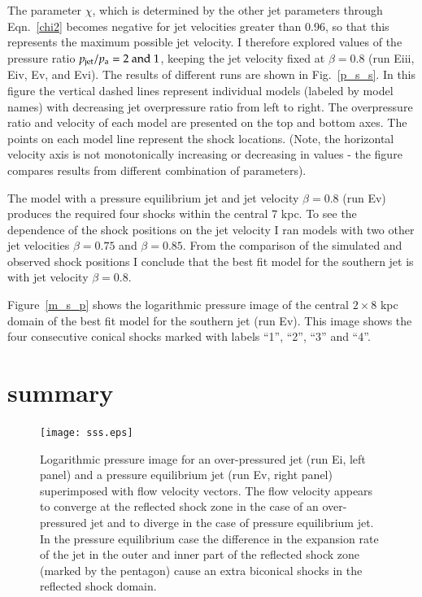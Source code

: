 The parameter $\chi$, which is determined by the other jet parameters through Eqn.~\ref{chi2} becomes negative for jet velocities greater than 0.96, so that this represents the maximum possible jet velocity. I therefore explored values of the pressure ratio $p_\mathrm{jet}/p_\mathrm{a} = 2 \rm  \ and \ 1$, keeping the jet velocity fixed at $\beta = 0.8$ (run Eiii, Eiv, Ev, and Evi). The results of different runs are shown in Fig.~\ref{p_s_s}. In this figure the vertical dashed lines represent individual models (labeled by model names) with decreasing jet overpressure ratio from left to right. The overpressure ratio and velocity of each model are presented on the top and bottom axes. The points on each model line represent the shock locations. (Note, the horizontal velocity axis is not monotonically increasing or decreasing in values - the figure compares results from different combination of parameters).

The model with a pressure equilibrium jet and jet velocity $\beta=0.8$ (run Ev) produces the required four shocks within the central 7 kpc. To see the dependence of the shock positions on the jet velocity I  ran models with two other jet velocities $\beta=0.75$ and $\beta=0.85$. From the comparison of the simulated and observed shock positions I conclude that the best fit model for the southern jet is with jet velocity $\beta = 0.8$. 

Figure~\ref{m_s_p} shows the logarithmic pressure image of the central $2\times8$ kpc domain of the best fit model for the southern jet (run Ev). This image shows the four consecutive conical shocks marked with labels ``1'', ``2'', ``3'' and ``4''.


\section{summary}
\begin{figure}[ht!]
\texttt{[image: sss.eps]}
\caption{Logarithmic pressure image for an over-pressured jet (run Ei, left panel) and a pressure equilibrium jet (run Ev, right panel) superimposed with flow velocity vectors. The flow velocity appears to converge at the reflected shock zone in the case of an over-pressured jet and to diverge in the case of pressure equilibrium jet. In the pressure equilibrium case the difference in the expansion rate of the jet in the outer and inner part of the reflected shock zone (marked by the pentagon) cause an extra biconical shocks in the reflected shock domain.}
\label{s_s}
\end{figure}

